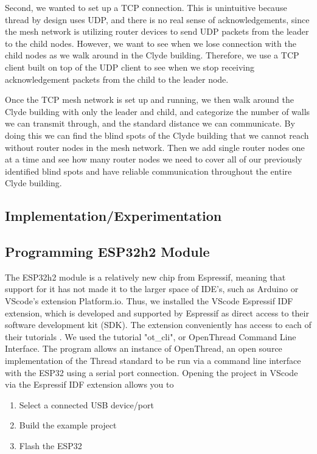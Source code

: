 \documentclass[letterpaper,twocolumn,10pt]{article}
\begin{document}
Second, we wanted to set up a TCP connection. This is unintuitive because thread by design uses UDP, and there is no real sense of acknowledgements, since the mesh network is utilizing router devices to send UDP packets from the leader to the child nodes. However, we want to see when we lose connection with the child nodes as we walk around in the Clyde building. Therefore, we use a TCP client built on top of the UDP client to see when we stop receiving acknowledgement packets from the child to the leader node. 

Once the TCP mesh network is set up and running, we then walk around the Clyde building with only the leader and child, and categorize the number of walls we can transmit through, and the standard distance we can communicate. By doing this we can find the blind spots of the Clyde building that we cannot reach without router nodes in the mesh network. Then we add single router nodes one at a time and see how many router nodes we need to cover all of our previously identified blind spots and have reliable communication throughout the entire Clyde building. 

\subsection*{Implementation/Experimentation}

\subsection{Programming ESP32h2 Module}

The ESP32h2 module is a relatively new chip from Espressif, meaning that support for it has not made it to the larger space of IDE's, such as Arduino or VScode's extension Platform.io. Thus, we installed the VScode Espressif IDF extension, which is developed and supported by Espressif as direct access to their software development kit (SDK). The extension conveniently has access to each of their tutorials \cite*{Thread_tutorial_2}. We used the tutorial "ot\_cli", or OpenThread Command Line Interface. The program allows an instance of OpenThread, an open source implementation of the Thread standard to be run via a command line interface with the ESP32 using a serial port connection. Opening the project in VScode via the Espressif IDF extension allows you to 
\begin{enumerate}
    \item Select a connected USB device/port
    \item Build the example project
    \item Flash the ESP32
\end{enumerate}
\end{document}
